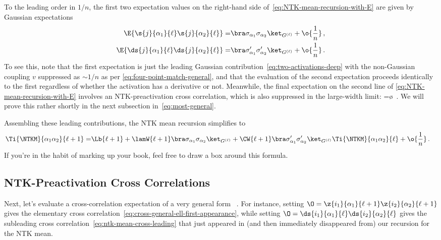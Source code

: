 To the leading order in $1/n$, the first two expectation values on the right-hand side of~\eqref{eq:NTK-mean-recursion-with-E} %
are given by Gaussian expectations
\begin{align}\label{eq:ntk-mean-gaussian-1}
\E{\s{j}{\alpha_1}{\ell} \s{j}{\alpha_2}{\ell}}=&\bra\sigma_{\alpha_1}\sigma_{\alpha_2}\ket_{G^{(\ell)}}+\o{\frac{1}{n}}\, ,\\
\E{\ds{j}{\alpha_1}{\ell} \ds{j}{\alpha_2}{\ell}}=&\bra\sigma^{\prime}_{\alpha_1}\sigma^{\prime}_{\alpha_2}\ket_{G^{(\ell)}}+\o{\frac{1}{n}}\, .\label{eq:ntk-mean-gaussian-2}
\end{align}
To see this, note that the first expectation is just the leading Gaussian contribution~\eqref{eq:two-activations-deep} with the non-Gaussian coupling $v$ suppressed as $\sim1/n$ as per \eqref{eq:four-point-match-general}, and that the evaluation of the second expectation proceeds identically to the first regardless of whether the activation has a derivative or not. Meanwhile, the final expectation on the second line of \eqref{eq:NTK-mean-recursion-with-E} involves an NTK-preactivation cross correlation, which is also suppressed in the large-width limit:
\be\label{eq:ntk-mean-cross-leading}
 =\o{}\, .
\ee
We will prove this rather shortly in the next subsection in~\eqref{eq:most-general}.

Assembling these leading contributions, the NTK mean recursion simplifies to 
\begin{align}\label{eq:NTHmean_final}\index{neural tangent kernel!mean|textbf}
\Ti{\NTKM}{\alpha_1\alpha_2}{\ell+1}=&\Lb{\ell+1} + \lamW{\ell+1}\bra\sigma_{\alpha_1}\sigma_{\alpha_2}\ket_{G^{(\ell)}}+\CW{\ell+1}\bra\sigma^{\prime}_{\alpha_1}\sigma^{\prime}_{\alpha_2}\ket_{G^{(\ell)}}\Ti{\NTKM}{\alpha_1\alpha_2}{\ell}+\o{\frac{1}{n}}\, .
\end{align}
If you're in the habit of marking up your book, feel free to draw a box around this formula.



\subsection{NTK-Preactivation Cross Correlations}\label{subsec:NTK-cross}
Next, let's evaluate a cross-correlation expectation of a very general form
\be\label{eq:cross-general}
\, .
\ee
For instance, setting $\O=\z{i_1}{\alpha_1}{\ell+1}\z{i_2}{\alpha_2}{\ell+1}$ gives the elementary cross correlation~\eqref{eq:cross-general-ell-first-appearance}, while setting $\O=\ds{i_1}{\alpha_1}{\ell} \ds{i_2}{\alpha_2}{\ell}$ gives the subleading cross correlation~\eqref{eq:ntk-mean-cross-leading} that just appeared in (and then immediately disappeared from) our recursion for the NTK mean.





